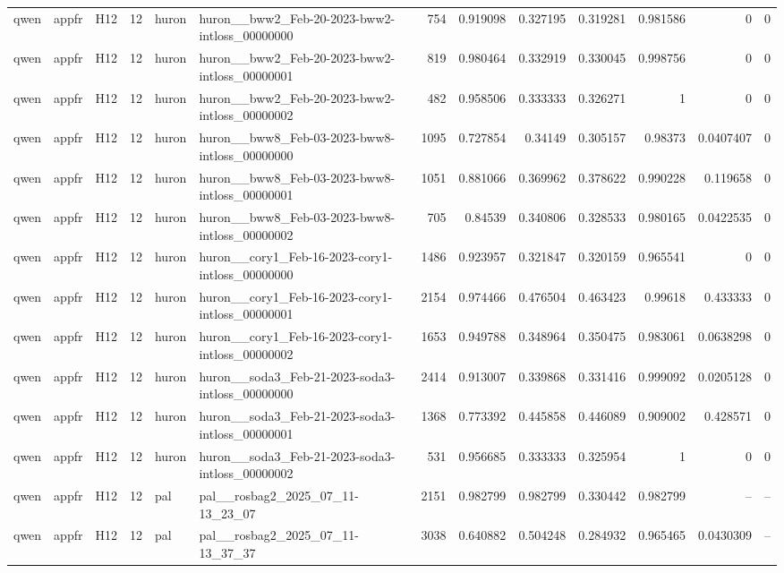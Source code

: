 \begin{longtable}{lllrllrrrrrrr}
qwen & appfr & H12 & 12 & huron & huron\_\_bww2\_Feb-20-2023-bww2-intloss\_00000000 & 754 & 0.919098 & 0.327195 & 0.319281 & 0.981586 & 0 & 0 \\
qwen & appfr & H12 & 12 & huron & huron\_\_bww2\_Feb-20-2023-bww2-intloss\_00000001 & 819 & 0.980464 & 0.332919 & 0.330045 & 0.998756 & 0 & 0 \\
qwen & appfr & H12 & 12 & huron & huron\_\_bww2\_Feb-20-2023-bww2-intloss\_00000002 & 482 & 0.958506 & 0.333333 & 0.326271 & 1 & 0 & 0 \\
qwen & appfr & H12 & 12 & huron & huron\_\_bww8\_Feb-03-2023-bww8-intloss\_00000000 & 1095 & 0.727854 & 0.34149 & 0.305157 & 0.98373 & 0.0407407 & 0 \\
qwen & appfr & H12 & 12 & huron & huron\_\_bww8\_Feb-03-2023-bww8-intloss\_00000001 & 1051 & 0.881066 & 0.369962 & 0.378622 & 0.990228 & 0.119658 & 0 \\
qwen & appfr & H12 & 12 & huron & huron\_\_bww8\_Feb-03-2023-bww8-intloss\_00000002 & 705 & 0.84539 & 0.340806 & 0.328533 & 0.980165 & 0.0422535 & 0 \\
qwen & appfr & H12 & 12 & huron & huron\_\_cory1\_Feb-16-2023-cory1-intloss\_00000000 & 1486 & 0.923957 & 0.321847 & 0.320159 & 0.965541 & 0 & 0 \\
qwen & appfr & H12 & 12 & huron & huron\_\_cory1\_Feb-16-2023-cory1-intloss\_00000001 & 2154 & 0.974466 & 0.476504 & 0.463423 & 0.99618 & 0.433333 & 0 \\
qwen & appfr & H12 & 12 & huron & huron\_\_cory1\_Feb-16-2023-cory1-intloss\_00000002 & 1653 & 0.949788 & 0.348964 & 0.350475 & 0.983061 & 0.0638298 & 0 \\
qwen & appfr & H12 & 12 & huron & huron\_\_soda3\_Feb-21-2023-soda3-intloss\_00000000 & 2414 & 0.913007 & 0.339868 & 0.331416 & 0.999092 & 0.0205128 & 0 \\
qwen & appfr & H12 & 12 & huron & huron\_\_soda3\_Feb-21-2023-soda3-intloss\_00000001 & 1368 & 0.773392 & 0.445858 & 0.446089 & 0.909002 & 0.428571 & 0 \\
qwen & appfr & H12 & 12 & huron & huron\_\_soda3\_Feb-21-2023-soda3-intloss\_00000002 & 531 & 0.956685 & 0.333333 & 0.325954 & 1 & 0 & 0 \\
qwen & appfr & H12 & 12 & pal & pal\_\_rosbag2\_2025\_07\_11-13\_23\_07 & 2151 & 0.982799 & 0.982799 & 0.330442 & 0.982799 & -- & -- \\
qwen & appfr & H12 & 12 & pal & pal\_\_rosbag2\_2025\_07\_11-13\_37\_37 & 3038 & 0.640882 & 0.504248 & 0.284932 & 0.965465 & 0.0430309 & -- \\

\end{longtable}

